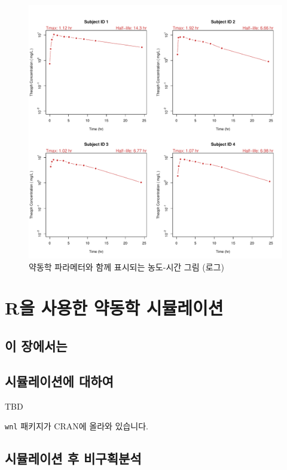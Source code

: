 \documentclass[
  12pt,
]{krantz}
\begin{document}
\begin{figure}
\includegraphics[width=1\linewidth]{Output/Individual PK Log 10 Scale for Theoph} \caption{약동학 파라메터와 함께 표시되는 농도-시간 그림 (로그)}\label{fig:unnamed-chunk-9}
\end{figure}

\hypertarget{rsimulation}{%
\chapter{R을 사용한 약동학 시뮬레이션}\label{rsimulation}}

\hypertarget{summary-simulation}{%
\section{이 장에서는}\label{summary-simulation}}

\hypertarget{sim-about}{%
\section{시뮬레이션에 대하여}\label{sim-about}}

TBD

\texttt{wnl} 패키지가 CRAN에 올라와 있습니다.

\hypertarget{sim-nca}{%
\section{시뮬레이션 후 비구획분석}\label{sim-nca}}
\end{document}
